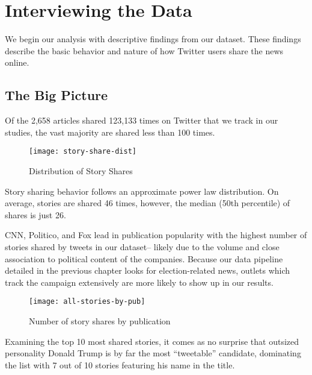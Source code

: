  \chapter{Interviewing the Data}
We begin our analysis with descriptive findings from our dataset.
These findings describe the basic behavior and nature of how Twitter users share the news online.

\section{The Big Picture}
Of the 2,658 articles shared 123,133 times on Twitter that we track in our studies, the vast majority are shared less than 100 times. 


\begin{figure}[H]  
\centering 
  \texttt{[image: story-share-dist]}  
  \caption{Distribution of Story Shares
    \label{fig:story-share-dist}}
\end{figure} 

Story sharing behavior follows an approximate power law distribution. On average, stories are shared 46 times, however, the median (50th percentile) of shares is just 26. 


CNN, Politico, and Fox lead in publication popularity with the highest number of stories shared by tweets in our dataset-- likely due to the volume and close association to political content of the companies. Because our data pipeline detailed in the previous chapter looks for election-related news, outlets which track the campaign extensively are more likely to show up in our results.


\begin{figure}[H]  
\centering 
  \texttt{[image: all-stories-by-pub]}  
  \caption{Number of story shares by publication
    \label{fig:tweets-by-pub}}
\end{figure} 


\newpage %

Examining the top 10 most shared stories, it comes as no surprise that outsized personality Donald Trump is by far the most ``tweetable'' candidate, dominating the list with 7 out of 10 stories featuring his name in the title.

